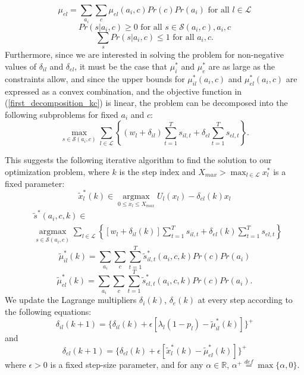 \documentclass[conference]{IEEEtran}
\begin{document}
\begin{equation*}
	\mu_{el} = \sum\limits_{a_i} \sum\limits_{c} \mu_{el}(a_i,c) Pr(c) Pr(a_i) \mbox{ for all } l \in \mathcal{L}
\end{equation*}
\begin{equation*}
	Pr(s | a_i, c) \geq 0 \mbox{ for all } s \in \mathcal{S}(a_i, c), a_i, c
\end{equation*}
\begin{equation*}
	\sum_{s} Pr(s | a_i, c) \leq 1 \mbox{ for all } a_i, c.
\end{equation*}
Furthermore, since we are interested in solving the problem for non-negative values of $\delta_{il}$ and $\delta_{el}$, it must be the case that $\mu_{i}^*$ and $\mu_{e}^*$ are as large as the constraints allow, and since the upper bounds for $\mu_{il}^*(a_i,c)$ and $\mu_{el}^*(a_i,c)$ are expressed as a convex combination, and the objective function in (\ref{first_decomposition_kc}) is linear, the problem can be decomposed into the following subproblems for fixed $a_i$ and $c$:
\begin{equation*}
	\max\limits_{s \in \mathcal{S}(a_i,c)} \sum\limits_{l \in \mathcal{L}} \left\{ (w_l+\delta_{il}) \sum_{t=1}^{T} s_{il,t} + \delta_{el} \sum_{t=1}^{T} s_{el,t} \right\}.
\end{equation*}

This suggests the following iterative algorithm to find the solution to our optimization problem, where $k$ is the step index and $X_{max} > \max_{l \in \mathcal{L}} x_l^*$ is a fixed parameter:
\begin{equation*}
	\tilde{x}_l^*(k) \in \mathop{\arg\max}\limits_{ 0 \leq x_l \leq X_{max} } U_l(x_l) - \delta_{el}(k) x_l
\end{equation*}
\begin{align*}
	& \tilde{s}^*(a_i,c,k) \in \\
	& \mathop{\arg\max}\limits_{s \in \mathcal{S}(a_i,c)} \sum\limits_{l \in \mathcal{L}} \left\{ [w_l+\delta_{il}(k)] \sum_{t=1}^{T} s_{il,t} + \delta_{el}(k) \sum_{t=1}^{T} s_{el,t} \right\}
\end{align*}
\begin{equation*}
	\tilde{\mu}_{il}^*(k) = \sum\limits_{a_i} \sum\limits_{c} \sum_{t=1}^{T} \tilde{s}_{il,t}^*(a_i, c, k) Pr(c) Pr(a_i)
\end{equation*}
\begin{equation*}
	\tilde{\mu}_{el}^*(k) = \sum\limits_{a_i} \sum\limits_{c} \sum_{t=1}^{T} \tilde{s}_{el,t}^*(a_i, c, k) Pr(c) Pr(a_i).
\end{equation*}
We update the Lagrange multipliers $\delta_i(k)$, $\delta_e(k)$ at every step according to the following equations:
\begin{equation*}
	\delta_{il}(k+1) = \{ \delta_{il}(k) + \epsilon [\lambda_l(1-p_l) - \tilde{\mu}_{il}^*(k)] \}^+
\end{equation*}
and
\begin{equation*}
	\delta_{el}(k+1) = \{ \delta_{el}(k) + \epsilon [\tilde{x}_l^*(k) - \tilde{\mu}_{el}^*(k)] \}^+
\end{equation*}
where $\epsilon>0$ is a fixed step-size parameter, and for any $\alpha \in \mathbb{R}$, $\alpha^+ \stackrel{def}{=}\max\{ \alpha, 0 \}$.
\end{document}
